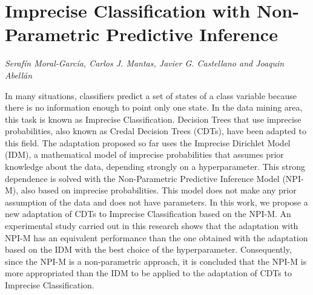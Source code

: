 \documentclass[../booklet.tex]{subfiles}
\begin{document}
\section[Imprecise Classification with Non-Parametric Predictive Inference. {\it Serafín Moral-García, Carlos J. Mantas, Javier G. Castellano and Joaquin Abellán}]{Imprecise Classification with Non-Parametric Predictive Inference}
   

\begin{center}
  {\it Serafín Moral-García, Carlos J. Mantas, Javier G. Castellano and Joaquin Abellán}
\end{center}

\vskip 0.8cm



In many situations, classifiers predict a set of states of a class variable because there is no information enough to point only one state. In the data mining area, this task is known as Imprecise Classification. Decision Trees that use imprecise probabilities, also known as Credal Decision Trees (CDTs), have been adapted to this field. The adaptation proposed so far uses the Imprecise Dirichlet Model (IDM), a mathematical model of imprecise probabilities that assumes prior knowledge about the data, depending strongly on a hyperparameter. This strong dependence is solved with the Non-Parametric Predictive Inference Model (NPI-M), also based on imprecise probabilities. This model does not make any prior assumption of the data and does not have parameters. In this work, we propose a new adaptation of CDTs to Imprecise Classification based on the NPI-M. An experimental study carried out in this research shows that the adaptation with NPI-M has an equivalent performance than the one obtained with the adaptation based on the IDM with the best choice of the hyperparameter.  Consequently, since the NPI-M is a non-parametric approach, it is concluded that the NPI-M is more appropriated than the IDM to be applied to the adaptation of CDTs to Imprecise Classification. 

\end{document}
